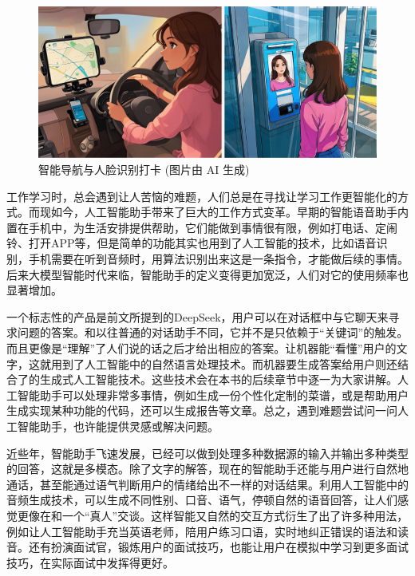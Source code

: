\begin{figure}[htb]
	\centering
	\includegraphics[width=\linewidth]{image/0/上班.png}
	\caption{智能导航与人脸识别打卡 (图片由 AI 生成)}
\end{figure}


工作学习时，总会遇到让人苦恼的难题，人们总是在寻找让学习工作更智能化的方式。而现如今，人工智能助手带来了巨大的工作方式变革。早期的智能语音助手内置在手机中，为生活安排提供帮助，它们能做到事情很有限，例如打电话、定闹铃、打开APP等，但是简单的功能其实也用到了人工智能的技术，比如语音识别，手机需要在听到音频时，用算法识别出来这是一条指令，才能做后续的事情。后来大模型智能时代来临，智能助手的定义变得更加宽泛，人们对它的使用频率也显著增加。

一个标志性的产品是前文所提到的DeepSeek，用户可以在对话框中与它聊天来寻求问题的答案。和以往普通的对话助手不同，它并不是只依赖于“关键词”的触发。而且更像是“理解”了人们说的话之后才给出相应的答案。让机器能“看懂”用户的文字，这就用到了人工智能中的自然语言处理技术。而机器要生成答案给用户则还结合了的生成式人工智能技术。这些技术会在本书的后续章节中逐一为大家讲解。人工智能助手可以处理非常多事情，例如生成一份个性化定制的菜谱，或是帮助用户生成实现某种功能的代码，还可以生成报告等文章。总之，遇到难题尝试问一问人工智能助手，也许能提供灵感或解决问题。

近些年，智能助手飞速发展，已经可以做到处理多种数据源的输入并输出多种类型的回答，这就是多模态。除了文字的解答，现在的智能助手还能与用户进行自然地通话，甚至能通过语气判断用户的情绪给出不一样的对话结果。利用人工智能中的音频生成技术，可以生成不同性别、口音、语气，停顿自然的语音回答，让人们感觉更像在和一个“真人”交谈。这样智能又自然的交互方式衍生了出了许多种用法，例如让人工智能助手充当英语老师，陪用户练习口语，实时地纠正错误的语法和读音。还有扮演面试官，锻炼用户的面试技巧，也能让用户在模拟中学习到更多面试技巧，在实际面试中发挥得更好。

